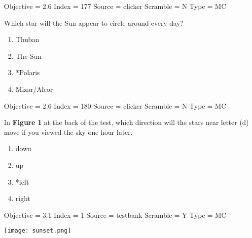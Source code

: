 \documentclass[11pt]{article}
\begin{document}
\begin{enumerate}
\begin{minipage}{\textwidth}
\begin{minipage}{\textwidth}
Objective = 2.6
Index = 177
Source = clicker
Scramble = N
Type = MC
\end{minipage}
\end{minipage}
\vskip 0.20in

\begin{minipage}{\textwidth}
\begin{minipage}{\textwidth}
\item Which star will the Sun appear to circle around every day?
\begin{multicols}{3}
\begin{enumerate} 
\setlength{\itemsep}{1pt} 
\setlength{\parskip}{0pt} 
\setlength{\parsep}{0pt}
\setlength{\multicolsep}{1pt} 
\item Thuban
\item The Sun
\item *Polaris
\item Mizar/Alcor
\end{enumerate} 
\vfill 
\end{multicols}

Objective = 2.6
Index = 180
Source = clicker
Scramble = N
Type = MC
\end{minipage}
\end{minipage}
\vskip 0.20in

\begin{minipage}{\textwidth}
\begin{minipage}{3.0in}
\item In {\bf Figure 1} at the back of the test, which direction will the stars near letter (d) move if you viewed the sky one hour later.
\begin{multicols}{2}
\begin{enumerate} 
\setlength{\itemsep}{1pt} 
\setlength{\parskip}{0pt} 
\setlength{\parsep}{0pt}
\setlength{\multicolsep}{1pt} 
\item down
\item up
\item *left
\item right
\end{enumerate} 
\vfill 
\end{multicols}

Objective = 3.1
Index = 1
Source = testbank
Scramble = Y
Type = MC
\end{minipage}
\hspace{0.5in}
\texttt{[image: sunset.png]}
\end{minipage}
\vskip 0.20in


\end{enumerate}
\end{document}
